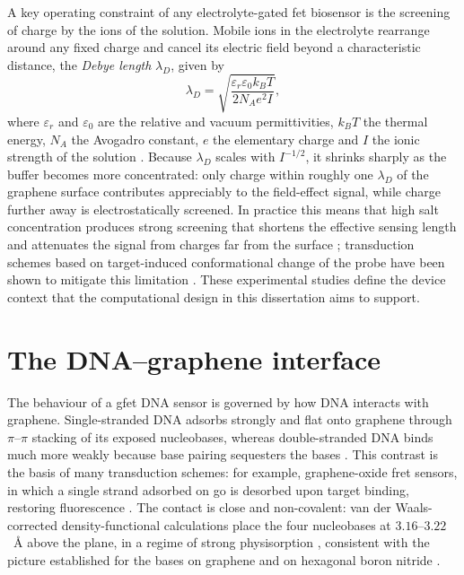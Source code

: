 A key operating constraint of any electrolyte-gated \acrshort{fet} biosensor is the screening of
charge by the ions of the solution. Mobile ions in the electrolyte rearrange around any fixed
charge and cancel its electric field beyond a characteristic distance, the \emph{Debye length}
$\lambda_D$, given by
\[
\lambda_D = \sqrt{\frac{\varepsilon_r \varepsilon_0 k_B T}{2 N_A e^2 I}},
\]
where $\varepsilon_r$ and $\varepsilon_0$ are the relative and vacuum permittivities, $k_B T$ the
thermal energy, $N_A$ the Avogadro constant, $e$ the elementary charge and $I$ the ionic strength of
the solution \citep{bhattacharyya2020}. Because $\lambda_D$ scales with $I^{-1/2}$, it shrinks
sharply as the buffer becomes more concentrated: only charge within roughly one $\lambda_D$ of the
graphene surface contributes appreciably to the field-effect signal, while charge further away is
electrostatically screened. In practice this means that high salt concentration produces strong
screening that shortens the effective sensing length and attenuates the signal from charges far from
the surface \citep{purwidyantri2021}; transduction schemes based on target-induced conformational
change of the probe have been shown to mitigate this limitation \citep{nakatsuka2018}. These
experimental studies define the device context that the computational design in this dissertation
aims to support.

\section{The DNA--graphene interface}

The behaviour of a \acrshort{gfet} DNA sensor is governed by how DNA interacts with graphene.
Single-stranded DNA adsorbs strongly and flat onto graphene through $\pi$--$\pi$ stacking of its exposed
nucleobases, whereas double-stranded DNA binds much more weakly because base pairing sequesters the
bases \citep{green2015,krishnan2023}. This contrast is the basis of many transduction schemes: for
example, graphene-oxide \acrfull{fret} sensors, in which a single strand adsorbed on
\acrfull{go} is desorbed upon target binding, restoring fluorescence \citep{lu2009,zhu2015}.
The contact is close and non-covalent: van der Waals-corrected density-functional calculations
place the four nucleobases at $3.16$--$3.22$~\AA{} above the plane, in a regime of strong
physisorption \citep{tayo2023}, consistent with the picture established for the bases on graphene
and on hexagonal boron nitride \citep{lee2013}.

